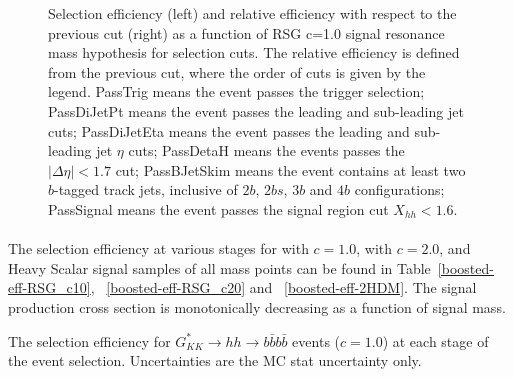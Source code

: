 \begin{figure}[htbp!]
  \caption{Selection efficiency (left) and relative efficiency with respect to the previous cut (right) as a function of RSG c=1.0 signal resonance mass hypothesis for selection cuts. The relative efficiency is defined from the previous cut, where the order of cuts is given by the legend. PassTrig means the event passes the trigger selection; PassDiJetPt means the event passes the leading and sub-leading jet \pt cuts; PassDiJetEta means the event passes the leading and sub-leading jet $\eta$ cuts; PassDetaH means the events passes the $|\Delta \eta| < 1.7$ cut; PassBJetSkim means the event contains at least two $b$-tagged track jets, inclusive of $2b$, $2bs$, $3b$ and $4b$ configurations; PassSignal means the event passes the signal region cut $X_{hh} < 1.6$.}
  \label{fig:boosted-selection-efficiency}
\end{figure}

\paragraph{}
The selection efficiency at various stages for \Grav with $c=1.0$, \Grav with $c=2.0$, and Heavy Scalar signal samples of all mass points can be found in Table~\ref{boosted-eff-RSG_c10}, ~\ref{boosted-eff-RSG_c20} and ~\ref{boosted-eff-2HDM}.
The signal production cross section is monotonically decreasing as a function of signal mass.



\begin{table}[htbp!]
\scriptsize
\caption{The selection efficiency for $G_{KK}^{*}\rightarrow hh\rightarrow b\bar{b}b\bar{b}$ events ($c=1.0$) at each stage of the event selection. Uncertainties are the MC stat uncertainty only.}
\begin{center}
\resizebox{\textwidth}{!}{

}
\end{center}
\label{boosted-eff-RSG_c10}
\end{table}

